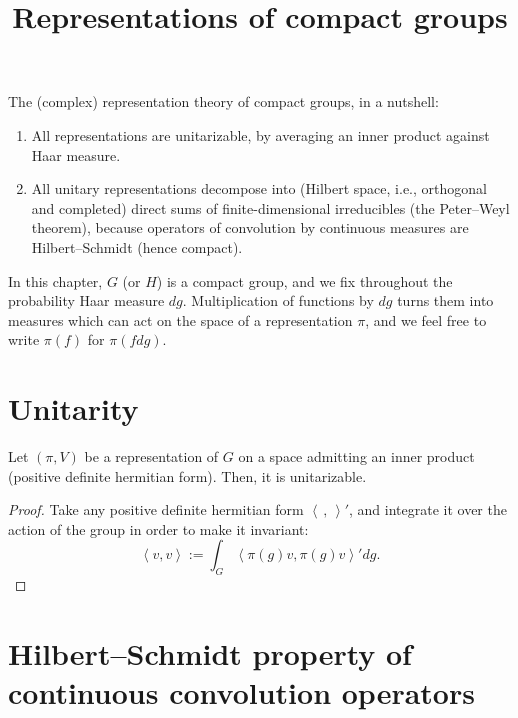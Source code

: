 

%


\title{Representations of compact groups}


\maketitle

\label{section-phantom}


\tableofcontents


The (complex) representation theory of compact groups, in a nutshell:
\begin{enumerate}
 \item All representations are unitarizable, by averaging an inner product against Haar measure.
 \item All unitary representations decompose into (Hilbert space, i.e., orthogonal and completed) direct sums of finite-dimensional irreducibles (the Peter--Weyl theorem), because operators of convolution by continuous measures are Hilbert--Schmidt (hence compact).
\end{enumerate}


In this chapter, $G$ (or $H$) is a compact group, and we fix throughout the probability Haar measure $dg$. Multiplication of functions by $dg$ turns them into measures which can act on the space of a representation $\pi$, and we feel free to write $\pi(f)$ for $\pi(f dg)$. 


\section{Unitarity}
\label{section-unitarity}

\begin{proposition}
\label{proposition-compact-unitarizable}
 Let $(\pi,V)$ be a representation of $G$ on a space admitting an inner product (positive definite hermitian form). Then, it is unitarizable.
\end{proposition}

\begin{proof}
 Take any positive definite hermitian form $\left< \, , \,\right>'$, and integrate it over the action of the group in order to make it invariant:
 $$ \left<  v, v\right>:= \int_G \left< \pi(g) v, \pi(g) v\right>' dg.$$
\end{proof}

\section{Hilbert--Schmidt property of continuous convolution operators}
\label{section-Hilbert-Schmidt}

